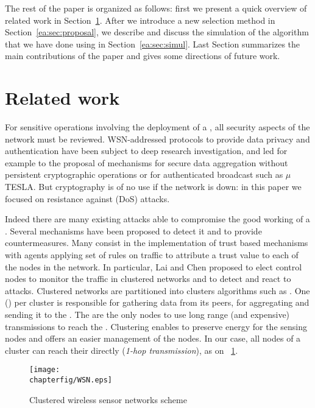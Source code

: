 The rest of the paper is organized as follows: first we present a quick overview of related work in Section~\ref{ea:sec:related}. After we introduce a new \cn selection method in Section~\ref{ea:sec:proposal}, we describe and discuss the simulation of the algorithm that we have done using \nsiii in Section~\ref{ea:sec:simul}.
Last Section summarizes the main contributions of the paper and gives some directions of future work.

\section{Related work}
\label{ea:sec:related}

For sensitive operations involving the deployment of a \wsn, all security aspects of the network must be reviewed.
WSN-addressed protocols to provide data privacy\cite{OX09} and authentication\cite{SOBMCN11} have been subject to deep research investigation, and led for example to the proposal of mechanisms for secure data aggregation without persistent cryptographic operations\cite{WDSX07} or for authenticated broadcast such as $\mu$TESLA\cite{PSWCT02}.
But cryptography is of no use if the network is down: in this paper we focused on resistance against \dos (DoS) attacks.

Indeed there are many existing attacks able to compromise the good working of a \wsn.%
Several mechanisms have been proposed to detect it and to provide countermeasures\cite{SSS11}. %
Many consist in the implementation of trust based mechanisms\cite{MC10,F-GRL07} with agents applying set of rules\cite{RKKK13} on traffic to attribute a trust value to each of the nodes in the network.
In particular, Lai and Chen\cite{LC08} proposed to elect control nodes to monitor the traffic in clustered networks and to detect and react to \dos attacks.
Clustered networks are partitioned into clusters \via algorithms such as \leach\cite{HHT02}.
One \ch (\CH) per cluster is responsible for gathering data from its peers, for aggregating and sending it to the \bs.
The \CHs are the only nodes to use long range (and expensive) transmissions to reach the \bs.
Clustering enables to preserve energy for the sensing nodes and offers an easier management of the nodes.
In our case, all nodes of a cluster can reach their \ch directly (\emph{1-hop transmission}), as on \figurename~\ref{ea:fig:wsn}.
\begin{figure}[h]
    \centering
    \texttt{[image: \\chapterfig/WSN.eps]}
    \caption{Clustered wireless sensor networks scheme}\label{ea:fig:wsn}
\end{figure}

